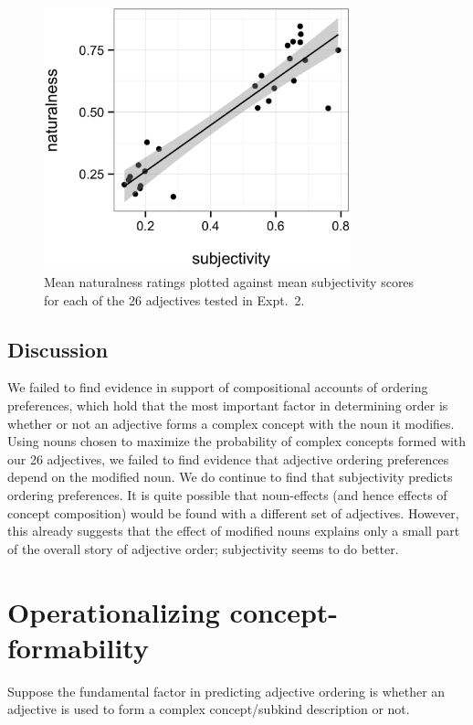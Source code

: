 \documentclass[12pt]{article}
\begin{document}
\renewcommand\thefigure{S.\arabic{figure}}
\begin{figure}
	\centering\includegraphics[width=3.5in]{plots/naturalness-subjectivity-new-nouns.eps}
	\caption{Mean naturalness ratings plotted against mean subjectivity scores for each of the 26 adjectives tested in Expt.~2.}\label{fig:subjectivity}
\end{figure}

\subsection{Discussion}

We  failed to find evidence in support of compositional accounts of ordering preferences, which hold that the most important factor in determining order is whether or not an adjective forms a complex concept with the noun it modifies. Using nouns chosen to maximize the probability of complex concepts formed with our 26 adjectives, we failed to find evidence that adjective ordering preferences depend on the modified noun. We do continue to find that subjectivity predicts ordering preferences.
It is quite possible that noun-effects (and hence effects of concept composition) would be found with a different set of adjectives. 
However, this already suggests that the effect of modified nouns explains only a small part of the overall story of adjective order; subjectivity seems to do better.



\section{Operationalizing concept-formability}

Suppose the fundamental factor in predicting adjective ordering is whether an adjective is used to form a complex concept/subkind description or not.
\end{document}
